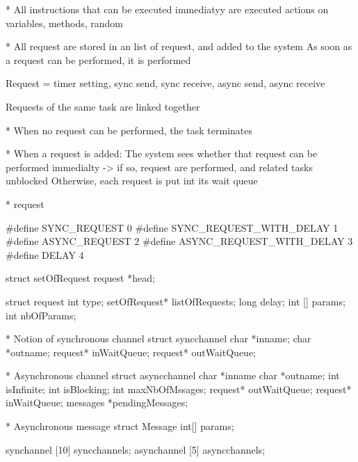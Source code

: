 * All instructions that can be executed immediatyy are executed
actions on variables, methods, random


* All request are stored in an list of request, and added to the system
As soon as a request can be performed, it is performed

Request = timer setting, sync send, sync receive, async send, async receive

Requests of the same task are linked together


* When no request can be performed, the task terminates

* When a request is added:
The system sees whether that request can be performed immedialty -> if so, request are performed, and related tasks unblocked
Otherwise, each request is put int its wait queue


* request

#define SYNC_REQUEST 0
#define SYNC_REQUEST_WITH_DELAY 1
#define ASYNC_REQUEST 2
#define ASYNC_REQUEST_WITH_DELAY 3
#define DELAY 4

struct setOfRequest {
  request *head;
}

struct request {
  int type;
  setOfRequest* listOfRequests;
  long delay;
  int [] params;
  int nbOfParams;
}


* Notion of synchronous channel
struct syncchannel {
  char *inname;
  char *outname;
  request* inWaitQueue;
  request* outWaitQueue; 
}

* Asynchronous channel
struct asyncchannel {
  char *inname
  char *outname;
  int isInfinite;
  int isBlocking;
  int maxNbOfMssages;
  request* outWaitQueue;
  request* inWaitQueue;
  messages *pendingMessages;
}

* Asynchronous message
struct Message {
  int[] params;
}



synchannel [10] syncchannels;
asynchannel [5] asyncchannels;

